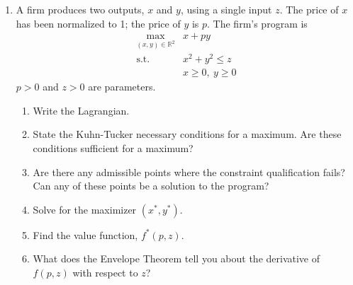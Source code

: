\documentclass[11pt,letterpaper]{scrartcl}
\begin{document}
\begin{enumerate}
	\item A firm produces two outputs, $x$ and $y$, using a single input $z$.
	The price of $x$ has been normalized to 1; the price of $y$ is $p$.
	The firm's program is
	\begin{align*}
	\max_{\left(x,y\right)\in\mathbb{R}^{2}} & x+py\\
	\text{s.t. } & x^{2}+y^{2}\leq z\\
	 & x\geq 0,\ y\geq0
	\end{align*}
	$p>0$ and $z>0$ are parameters.
	\begin{enumerate}
	\item Write the Lagrangian.
	\item State the Kuhn-Tucker necessary conditions for a maximum. Are these
	conditions sufficient for a maximum?
	\item Are there any admissible points where the constraint qualification
	fails? Can any of these points be a solution to the program?
	\item Solve for the maximizer $\left(x^{*},y^{*}\right)$.
	\item Find the value function, $f^{*}\left(p,z\right)$.
	\item What does the Envelope Theorem tell you about the derivative of $f\left(p,z\right)$
	with respect to $z$?
	\end{enumerate}
	
\end{enumerate}
\end{document}
